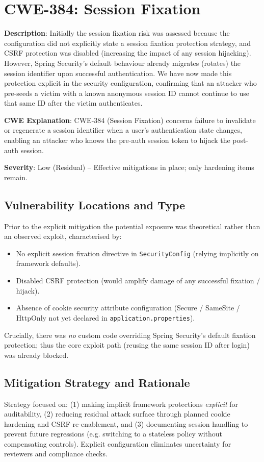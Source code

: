 \documentclass[]{UCD_CS_FYP_Report}
\begin{document}
\section{CWE-384: Session Fixation}

	\textbf{Description}: Initially the session fixation risk was assessed because the configuration did not explicitly state a session fixation protection strategy, and CSRF protection was disabled (increasing the impact of any session hijacking). However, Spring Security's default behaviour already migrates (rotates) the session identifier upon successful authentication. We have now made this protection explicit in the security configuration, confirming that an attacker who pre-seeds a victim with a known anonymous session ID cannot continue to use that same ID after the victim authenticates.

	\textbf{CWE Explanation}: CWE-384 (Session Fixation) concerns failure to invalidate or regenerate a session identifier when a user's authentication state changes, enabling an attacker who knows the pre-auth session token to hijack the post-auth session.

	\textbf{Severity}: Low (Residual) – Effective mitigations in place; only hardening items remain.

\subsection{Vulnerability Locations and Type}
Prior to the explicit mitigation the potential exposure was theoretical rather than an observed exploit, characterised by:
\begin{itemize}
	\item No explicit session fixation directive in \texttt{SecurityConfig} (relying implicitly on framework defaults).\newline
	\item Disabled CSRF protection (would amplify damage of any successful fixation / hijack).\newline
	\item Absence of cookie security attribute configuration (Secure / SameSite / HttpOnly not yet declared in \texttt{application.properties}).
\end{itemize}
Crucially, there was \emph{no} custom code overriding Spring Security's default fixation protection; thus the core exploit path (reusing the same session ID after login) was already blocked.

\subsection{Mitigation Strategy and Rationale}
Strategy focused on: (1) making implicit framework protections \emph{explicit} for auditability, (2) reducing residual attack surface through planned cookie hardening and CSRF re-enablement, and (3) documenting session handling to prevent future regressions (e.g. switching to a stateless policy without compensating controls). Explicit configuration eliminates uncertainty for reviewers and compliance checks.
\end{document}
